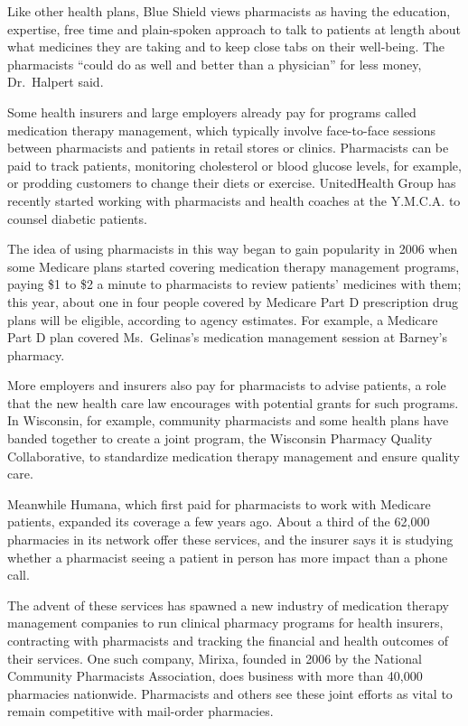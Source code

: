 ﻿\documentclass[12pt]{article}
\begin{document}
Like other health plans, Blue Shield views pharmacists as having the education, expertise, free time
and plain-spoken approach to talk to patients at length about what medicines they are taking and to
keep close tabs on their well-being. The pharmacists ``could do as well and better than a
physician'' for less money, Dr.~Halpert said.

Some health insurers and large employers already pay for programs called medication therapy
management, which typically involve face-to-face sessions between pharmacists and patients in retail
stores or clinics. Pharmacists can be paid to track patients, monitoring cholesterol or blood
glucose levels, for example, or prodding customers to change their diets or exercise. UnitedHealth
Group has recently started working with pharmacists and health coaches at the Y.M.C.A. to counsel
diabetic patients.

The idea of using pharmacists in this way began to gain popularity in 2006 when some Medicare plans
started covering medication therapy management programs, paying \$1 to \$2 a minute to pharmacists
to review patients' medicines with them; this year, about one in four people covered by Medicare
Part D prescription drug plans will be eligible, according to agency estimates. For example, a
Medicare Part D plan covered Ms.~Gelinas's medication management session at Barney's pharmacy.

More employers and insurers also pay for pharmacists to advise patients, a role that the new health
care law encourages with potential grants for such programs. In Wisconsin, for example, community
pharmacists and some health plans have banded together to create a joint program, the Wisconsin
Pharmacy Quality Collaborative, to standardize medication therapy management and ensure quality
care.

Meanwhile Humana, which first paid for pharmacists to work with Medicare patients, expanded its
coverage a few years ago. About a third of the 62,000 pharmacies in its network offer these
services, and the insurer says it is studying whether a pharmacist seeing a patient in person has
more impact than a phone call.

The advent of these services has spawned a new industry of medication therapy management companies
to run clinical pharmacy programs for health insurers, contracting with pharmacists and tracking the
financial and health outcomes of their services. One such company, Mirixa, founded in 2006 by the
National Community Pharmacists Association, does business with more than 40,000 pharmacies
nationwide. Pharmacists and others see these joint efforts as vital to remain competitive with
mail-order pharmacies.
\end{document}
